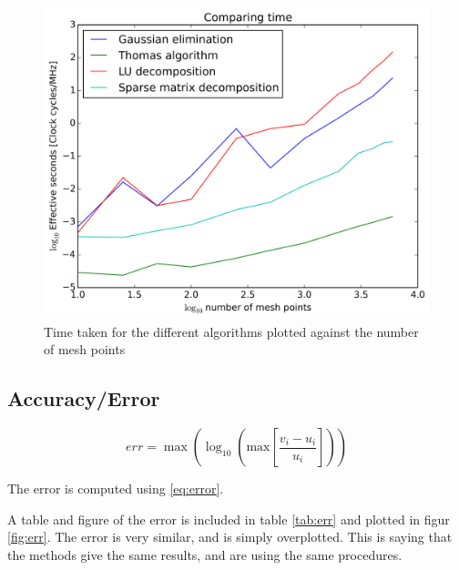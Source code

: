 \documentclass[11pt,a4paper,english,draft]{article}
\numberwithin{equation}{section}
\begin{document}
\begin{figure}[ht!]
\centering
  \includegraphics[scale=0.5]{Results/n_time.png}
  \caption{Time taken for the different algorithms plotted against 
  the number of mesh points}
  \label{fig:time}
\end{figure}


\subsection{Accuracy/Error}

\begin{equation}
err = \max \left(\log_{10} \left(\mathrm{max}\left[
\frac{v_i - u_i}{u_i} \right]\right)\right)
\label{eq:error}
\end{equation}


The error is computed using \eqref{eq:error}.

A table and figure of the error is included in table \ref{tab:err} 
and plotted in figur \ref{fig:err}. The error is very similar,
and is simply overplotted. This is saying that the methods
give the same results, and are using the same procedures.
\end{document}
